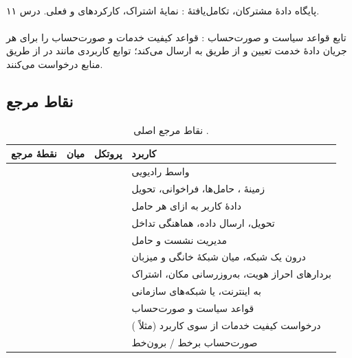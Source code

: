 \documentclass[11pt,a4paper]{article}
\begin{document}
\paragraph{} پایگاه دادهٔ مشترکان، تکامل‌یافتهٔ : نمایهٔ اشتراک، کارکردهای
 و  فعلی. درس ۱۱.

\paragraph{} تابع قواعد سیاست و صورت‌حساب \cite{ts23203}: قواعد کیفیت خدمات و صورت‌حساب را
برای هر جریان دادهٔ خدمت تعیین و از طریق  به  ارسال می‌کند؛ توابع کاربردی مانند
 در  از طریق  منابع درخواست می‌کنند.

\subsection{نقاط مرجع}
\begin{table}[htbp]
\centering\small
\caption{نقاط مرجع اصلی  \cite{ts23401}.}\label{tab:ref}
\begin{tabularx}{\linewidth}{@{}l l l Y@{}}
\toprule
{}نقطهٔ مرجع & میان & پروتکل & کاربرد \\
\midrule
{}  &      &  & واسط رادیویی \\
  &     &         & زمینهٔ ، حامل‌ها، فراخوانی، تحویل \\
    &    &      & دادهٔ کاربر به ازای هر حامل \\
      &     &           & تحویل، ارسال داده، هماهنگی تداخل \\
     &    &                & مدیریت نشست و حامل \\
   &   &        &  درون یک شبکه،  میان شبکهٔ خانگی و میزبان \\
     &     &               & بردارهای احراز هویت، به‌روزرسانی مکان، اشتراک \\
     &    &                     & به اینترنت،  یا شبکه‌های سازمانی \\
      &   &               & قواعد سیاست و صورت‌حساب \\
      &     &               & درخواست کیفیت خدمات از سوی کاربرد (مثلاً ) \\
   &  &     & صورت‌حساب برخط / برون‌خط \\
\bottomrule
\end{tabularx}
\end{table}
\end{document}
